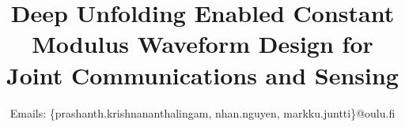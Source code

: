 \documentclass[conference]{IEEEtran}
\begin{document}
\title{Deep Unfolding Enabled Constant Modulus Waveform Design for Joint Communications and Sensing\\
}

\author{%
Emails: \{prashanth.krishnananthalingam, nhan.nguyen, markku.juntti\}@oulu.fi}
%
%
%
%

\maketitle
\end{document}
